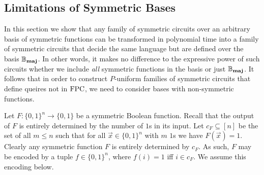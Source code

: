 \documentclass[../paper.tex]{subfiles}
\begin{document}







\subsection{Limitations of Symmetric Bases}
In this section we show that any family of symmetric circuits over an arbitrary
basis of symmetric functions can be transformed in polynomial time into a family of
symmetric circuits that decide the same language but are defined over the basis
$\mathbb{B}_{\text{\textbf{maj}}}$.  In other words, it makes no difference to the
expressive power of such circuits whether we include \emph{all}
symmetric functions in the basis or just $\mathbb{B}_{\text{\textbf{maj}}}$.
It follows that in order to construct $P$-uniform families of
symmetric circuits that define queires not in $\text{\upshape FPC}$, we need to
consider bases with non-symmetric functions.


Let $F : \{0,1\}^n\rightarrow \{0,1\}$ be a symmetric Boolean function. Recall
that the output of $F$ is entirely determined by the number of $1$s in its
input. Let $c_{F} \subseteq [n]$ be the set of all $m \leq n$ such that for
all $\vec{x} \in \{ 0,1 \}^n$ with $m$ $1$s we have $F (\vec{x}) = 1$. Clearly
any symmetric function $F$ is entirely determined by $c_{F}$. As such, $F$
may be encoded by a tuple $f \in \{0,1\}^{n}$, where $f (i) = 1 $ iff $i
\in c_{F}$. We assume this encoding below.
 
\end{document}
